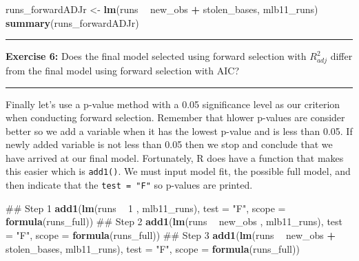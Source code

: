 \documentclass[]{book}
\newenvironment{Shaded}{\begin{snugshade}}{\end{snugshade}}
\newcommand{\KeywordTok}[1]{\textcolor[rgb]{0.13,0.29,0.53}{\textbf{#1}}}
\newcommand{\DataTypeTok}[1]{\textcolor[rgb]{0.13,0.29,0.53}{#1}}
\newcommand{\DecValTok}[1]{\textcolor[rgb]{0.00,0.00,0.81}{#1}}
\newcommand{\StringTok}[1]{\textcolor[rgb]{0.31,0.60,0.02}{#1}}
\newcommand{\OperatorTok}[1]{\textcolor[rgb]{0.81,0.36,0.00}{\textbf{#1}}}
\newcommand{\NormalTok}[1]{#1}
\theoremstyle{definition}
\theoremstyle{definition}
\theoremstyle{definition}
\theoremstyle{remark}
\begin{document}
\begin{Shaded}
\begin{Highlighting}[]
\NormalTok{runs_forwardADJr <-}\StringTok{ }\KeywordTok{lm}\NormalTok{(runs }\OperatorTok{~}\StringTok{ }\NormalTok{new_obs }\OperatorTok{+}\StringTok{ }\NormalTok{stolen_bases, mlb11_runs)}
\KeywordTok{summary}\NormalTok{(runs_forwardADJr)}
\end{Highlighting}
\end{Shaded}

\begin{center}\rule{0.5\linewidth}{\linethickness}\end{center}

\textbf{Exercise 6:} Does the final model selected using forward
selection with \(R^2_{adj}\) differ from the final model using forward
selection with AIC?

\begin{center}\rule{0.5\linewidth}{\linethickness}\end{center}

Finally let's use a p-value method with a 0.05 significance level as our
criterion when conducting forward selection. Remember that hlower
p-values are consider better so we add a variable when it has the lowest
p-value and is less than 0.05. If newly added variable is not less than
0.05 then we stop and conclude that we have arrived at our final model.
Fortunately, R does have a function that makes this easier which is
\texttt{add1()}. We must input model fit, the possible full model, and
then indicate that the \texttt{test\ =\ "F"} so p-values are printed.

\begin{Shaded}
\begin{Highlighting}[]
\NormalTok{## Step 1}
\KeywordTok{add1}\NormalTok{(}\KeywordTok{lm}\NormalTok{(runs }\OperatorTok{~}\StringTok{ }\DecValTok{1}\NormalTok{ , mlb11_runs), }\DataTypeTok{test =} \StringTok{"F"}\NormalTok{, }\DataTypeTok{scope =} \KeywordTok{formula}\NormalTok{(runs_full))}
\NormalTok{## Step 2}
\KeywordTok{add1}\NormalTok{(}\KeywordTok{lm}\NormalTok{(runs }\OperatorTok{~}\StringTok{ }\NormalTok{new_obs , mlb11_runs), }\DataTypeTok{test =} \StringTok{"F"}\NormalTok{, }\DataTypeTok{scope =} \KeywordTok{formula}\NormalTok{(runs_full))}
\NormalTok{## Step 3}
\KeywordTok{add1}\NormalTok{(}\KeywordTok{lm}\NormalTok{(runs }\OperatorTok{~}\StringTok{ }\NormalTok{new_obs }\OperatorTok{+}\StringTok{ }\NormalTok{stolen_bases, mlb11_runs), }\DataTypeTok{test =} \StringTok{"F"}\NormalTok{, }\DataTypeTok{scope =} \KeywordTok{formula}\NormalTok{(runs_full))}
\end{Highlighting}
\end{Shaded}
\end{document}
